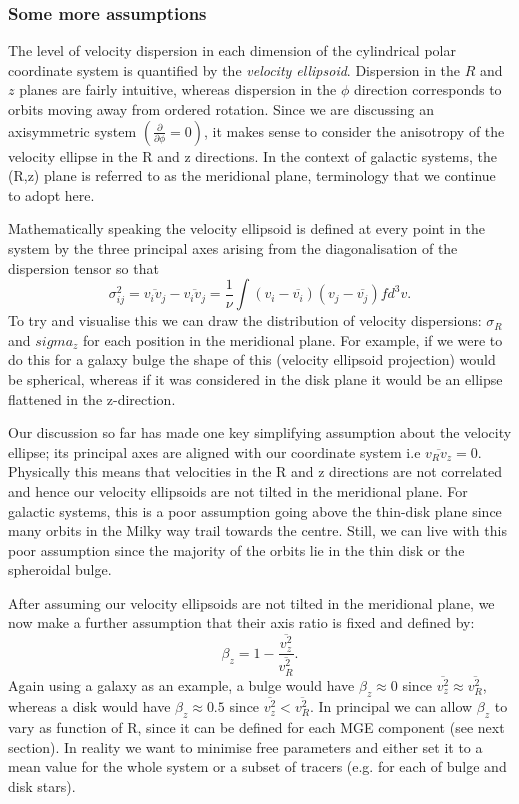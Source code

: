\subsubsection{Some more assumptions}
The level of velocity dispersion in each dimension of the cylindrical polar coordinate system is quantified by the \textit{velocity ellipsoid}. Dispersion in the $R$ and $z$ planes are fairly intuitive, whereas dispersion in the $\phi$ direction corresponds to orbits moving away from ordered rotation. Since we are discussing an axisymmetric system $(\frac{\partial }{\partial \phi} = 0)$, it makes sense to consider the anisotropy of the velocity ellipse in the R and z directions. In the context of galactic systems, the (R,z) plane is referred to as the meridional plane, terminology that we continue to adopt here.

Mathematically speaking the velocity ellipsoid is defined at every point in the system by the three principal axes arising from the diagonalisation of the dispersion tensor so that
\begin{equation}
\sigma_{ij}^{2} = \overline{v_i v_j} - \overline{v_i v_j} = \frac{1}{\nu} \int (v_i - \overline{v_i})(v_j - \overline{v_j}) f d^3 v.
\end{equation}
To try and visualise this we can draw the distribution of velocity dispersions: $\sigma_R$ and $sigma_z$ for each position in the meridional plane. For example, if we were to do this for a galaxy bulge the shape of this (velocity ellipsoid projection) would be spherical, whereas if it was considered in the disk plane it would be an ellipse flattened in the z-direction. 

Our discussion so far has made one key simplifying assumption about the velocity ellipse; its principal axes are aligned with our coordinate system i.e $\overline{v_R v_z} = 0$. Physically this means that velocities in the R and z directions are not correlated and hence our velocity ellipsoids are not tilted in the meridional plane. For galactic systems, this is a poor assumption going above the thin-disk plane since many orbits in the Milky way trail towards the centre. Still, we can live with this poor assumption since the majority of the orbits lie in the thin disk or the spheroidal bulge. 

After assuming our velocity ellipsoids are not tilted in the meridional plane, we now make a further assumption that their axis ratio is fixed and defined by:
\begin{equation} \label{beta_z}
\beta_z = 1 - \frac{\overline{v_{z}^2}}{\overline{v_{R}^2}}.
\end{equation}
Again using a galaxy as an example, a bulge would have $\beta_z \approx 0$ since $\overline{v_z^2} \approx \overline{v_R^2}$, whereas a disk would have $\beta_z \approx 0.5$ since $\overline{v_z^2} < \overline{v_R^2}$. In principal we can allow $\beta_z$ to vary as function of R, since it can be defined for each MGE component (see next section). In reality we want to minimise free parameters and either set it to a mean value for the whole system or a subset of tracers (e.g. for each of bulge and disk stars). 

